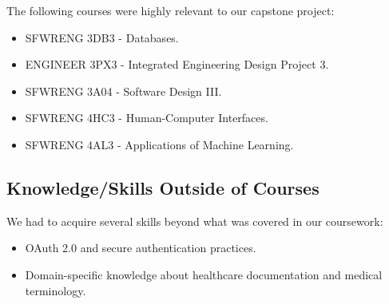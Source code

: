 \documentclass{article}
\begin{document}
 The following courses were highly relevant to our capstone project:
 \begin{itemize}
     \item SFWRENG 3DB3 - Databases.
     \item ENGINEER 3PX3 - Integrated Engineering Design Project 3.
     \item SFWRENG 3A04 - Software Design III.
     \item SFWRENG 4HC3 - Human-Computer Interfaces.
     \item SFWRENG 4AL3 - Applications of Machine Learning.
 \end{itemize}
 
 \subsection{Knowledge/Skills Outside of Courses}
 
 We had to acquire several skills beyond what was covered in our coursework:
 \begin{itemize}
     \item OAuth 2.0 and secure authentication practices.
     \item Domain-specific knowledge about healthcare documentation and medical terminology.
 \end{itemize}
\end{document}
